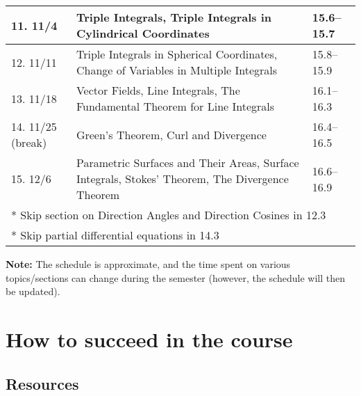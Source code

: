 \documentclass[oneside,11pt]{amsart}
\theoremstyle{definition}
\begin{document}
\begin{center}
\begin{longtable}{|l|p{}|l|}
    \hline
    11. 11/4 & Triple Integrals, Triple Integrals in Cylindrical Coordinates & 15.6--15.7 \\
    \hline
    12. 11/11 & Triple Integrals in Spherical Coordinates, Change of Variables in Multiple Integrals & 15.8--15.9 \\
    \hline
    13. 11/18 & Vector Fields, Line Integrals, The Fundamental Theorem for Line Integrals & 16.1--16.3 \\
    \hline
    14. 11/25
		(break) & Green's Theorem, Curl and Divergence & 16.4--16.5 \\
    \hline
		15. 12/6 & 
		Parametric Surfaces and Their Areas, Surface Integrals,
		Stokes' Theorem, The Divergence Theorem
		& 16.6--16.9 \\
		\hline
    \multicolumn{3}{l}{* Skip section on Direction Angles and Direction Cosines in 12.3}\\
	\multicolumn{3}{l}{* Skip partial differential equations in 14.3} \\
\end{longtable}
\end{center}

\vspace{5pt}

\textbf{Note:} The schedule is approximate, and the time spent on various topics/sections can change during the semester (however, the schedule will then be updated).

\section{How to succeed in the course}

\subsection{Resources}
\end{document}
